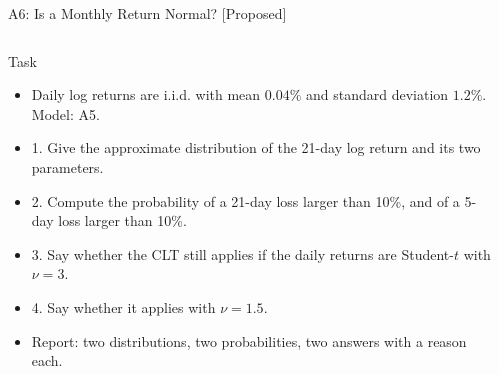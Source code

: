 \begin{frame}{A6: Is a Monthly Return Normal? [Proposed]}
\propsub
\itemsize{\scriptsize}
\begin{columns}[T]
\begin{column}{\taskw}
\begin{block}{Task}
\begin{itemize}
    \item Daily log returns are i.i.d. with mean $0.04\%$ and standard deviation $1.2\%$. Model: A5.
    \item 1. Give the approximate distribution of the 21-day log return and its two parameters.
    \item 2. Compute the probability of a 21-day loss larger than 10\%, and of a 5-day loss larger than 10\%.
    \item 3. Say whether the CLT still applies if the daily returns are Student-$t$ with $\nu = 3$.
    \item 4. Say whether it applies with $\nu = 1.5$.
    \item Report: two distributions, two probabilities, two answers with a reason each.
\end{itemize}
\end{block}
\end{column}
\begin{column}{\solw}
\end{column}
\end{columns}
\end{frame}

